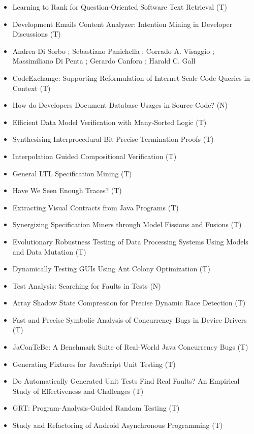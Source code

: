 {\small
\begin{itemize}[itemsep=-1ex]
  \item Learning to Rank for Question-Oriented Software Text Retrieval (T)
  \item Development Emails Content Analyzer: Intention Mining in Developer Discussions (T)
  \item Andrea Di Sorbo ; Sebastiano Panichella ; Corrado A. Visaggio ; Massimiliano Di Penta ; Gerardo Canfora ; Harald C. Gall
  \item CodeExchange: Supporting Reformulation of Internet-Scale Code Queries in Context (T)
  \item How do Developers Document Database Usages in Source Code? (N)
  \item Efficient Data Model Verification with Many-Sorted Logic (T)
  \item Synthesising Interprocedural Bit-Precise Termination Proofs (T)
  \item Interpolation Guided Compositional Verification (T)
  \item General LTL Specification Mining (T)
  \item Have We Seen Enough Traces? (T)
  \item Extracting Visual Contracts from Java Programs (T)
  \item Synergizing Specification Miners through Model Fissions and Fusions (T)
  \item Evolutionary Robustness Testing of Data Processing Systems Using Models and Data Mutation (T)
  \item Dynamically Testing GUIs Using Ant Colony Optimization (T)
  \item Test Analysis: Searching for Faults in Tests (N)
  \item Array Shadow State Compression for Precise Dynamic Race Detection (T)
  \item Fast and Precise Symbolic Analysis of Concurrency Bugs in Device Drivers (T)
  \item JaConTeBe: A Benchmark Suite of Real-World Java Concurrency Bugs (T)
  \item Generating Fixtures for JavaScript Unit Testing (T)
  \item Do Automatically Generated Unit Tests Find Real Faults? An Empirical Study of Effectiveness and Challenges (T)
  \item GRT: Program-Analysis-Guided Random Testing (T)
  \item Study and Refactoring of Android Asynchronous Programming (T)

\end{itemize}}
